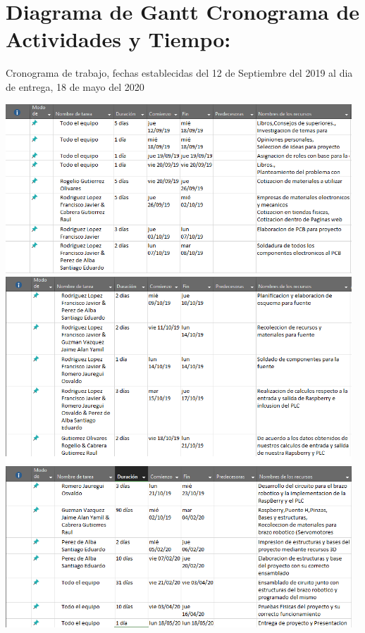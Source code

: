 \documentclass[14pt,a4paper]{article}
\begin{document}
\section{Diagrama de Gantt Cronograma de Actividades y Tiempo:}
Cronograma de trabajo, fechas establecidas del 12 de  Septiembre del 2019 al dia de entrega, 18 de mayo del 2020

\begin{center}

\includegraphics[width=13cm]{Esquema1.png} 
\includegraphics[width=13cm]{Esquema2.png} 
\includegraphics[width=13cm]{Esquema3.png} 

\end{center}
\end{document}
